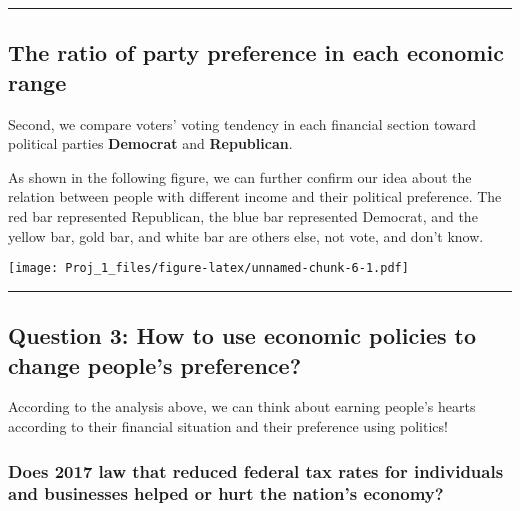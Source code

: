 \documentclass[
]{article}
\begin{document}
\begin{center}\rule{0.5\linewidth}{0.5pt}\end{center}

\hypertarget{the-ratio-of-party-preference-in-each-economic-range}{%
\subsection{The ratio of party preference in each economic
range}\label{the-ratio-of-party-preference-in-each-economic-range}}

Second, we compare voters' voting tendency in each financial section
toward political parties \textbf{Democrat} and \textbf{Republican}.

As shown in the following figure, we can further confirm our idea about
the relation between people with different income and their political
preference. The red bar represented Republican, the blue bar represented
Democrat, and the yellow bar, gold bar, and white bar are others else,
not vote, and don't know.

\texttt{[image: Proj\_1\_files/figure-latex/unnamed-chunk-6-1.pdf]}

\begin{center}\rule{0.5\linewidth}{0.5pt}\end{center}

\hypertarget{question-3-how-to-use-economic-policies-to-change-peoples-preference}{%
\subsection{Question 3: How to use economic policies to change people's
preference?}\label{question-3-how-to-use-economic-policies-to-change-peoples-preference}}

According to the analysis above, we can think about earning people's
hearts according to their financial situation and their preference using
politics!

\hypertarget{does-2017-law-that-reduced-federal-tax-rates-for-individuals-and-businesses-helped-or-hurt-the-nations-economy}{%
\subsubsection{Does 2017 law that reduced federal tax rates for
individuals and businesses helped or hurt the nation's
economy?}\label{does-2017-law-that-reduced-federal-tax-rates-for-individuals-and-businesses-helped-or-hurt-the-nations-economy}}
\end{document}
